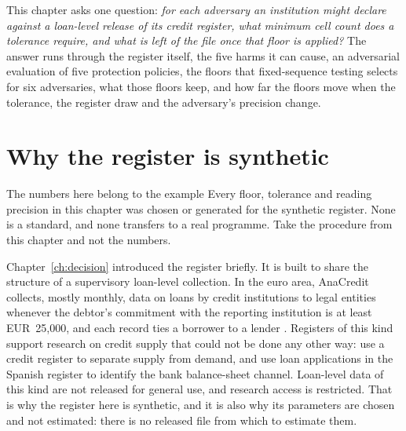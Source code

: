 This chapter asks one question: \emph{for each adversary an institution might
declare against a loan-level release of its credit register, what minimum cell count
does a tolerance require, and what is left of the file once that floor is applied?}
The answer runs through the register itself, the five harms it can cause, an
adversarial evaluation of five protection policies, the floors that fixed-sequence
testing selects for six adversaries, what those floors keep, and how far the floors
move when the tolerance, the register draw and the adversary's precision change.

\section{Why the register is synthetic}

\begin{practicebox}{The numbers here belong to the example}
Every floor, tolerance and reading precision in this chapter was chosen or generated for the synthetic register. None is a standard, and none transfers to a real programme. Take the procedure from this chapter and not the numbers.
\end{practicebox}


Chapter~\ref{ch:decision} introduced the register briefly. It is built to share the
structure of a supervisory loan-level collection. In the euro area, AnaCredit
collects, mostly monthly, data on loans by credit institutions to legal entities
whenever the debtor's commitment with the reporting institution is at least
EUR~25{,}000, and each record ties a borrower to a lender
\citep{ecb2016,israel2017}.
Registers of this kind support research on credit supply that could not be done any
other way: \citet{khwaja2008} use a credit register to separate supply from demand,
and \citet{jimenez2012} use loan applications in the Spanish register to identify
the bank balance-sheet channel. Loan-level data of this kind are not released for
general use, and research access is restricted. That is why the register here is
synthetic, and it is also why its parameters are chosen and not estimated: there is
no released file from which to estimate them.

